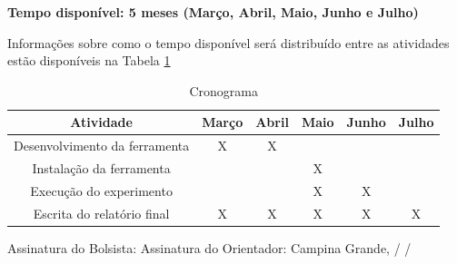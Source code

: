 \documentclass[a4paper,10pt]{article}
\begin{document}
\textbf{Tempo disponível: 5 meses (Março, Abril, Maio, Junho e Julho)}\newline

Informações sobre como o tempo disponível será distribuído entre as atividades
estão disponíveis na Tabela \ref{time_management}

\begin{table}[htp]
  \centering
  \caption{Cronograma}
  \label{time_management}
  \begin{tabular}{|c|c|c|c|c|c|}
    \hline
      Atividade & Março & Abril & Maio & Junho & Julho \\
    \hline
    \hline
      Desenvolvimento da ferramenta & X & X & & & \\ 
    \hline
      Instalação da ferramenta & &  & X & & \\
    \hline
      Execução do experimento & & & X & X & \\
    \hline
      Escrita do relatório final & X & X & X & X & X \\
    \hline
  \end{tabular}
\end{table}

\null
\vfill
\newpage



\newpage
\null
\vfill
Assinatura do Bolsista:  \underline{\hspace{12cm}}
\newline
Assinatura do Orientador:  \underline{\hspace{12cm}}
\newline
Campina Grande, \underline{\hspace{1cm}} / \underline{\hspace{1cm}} /
\underline{\hspace{1cm}}\newline
\end{document}
